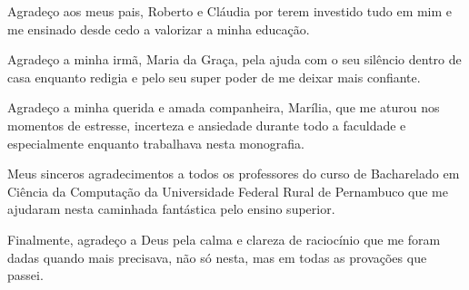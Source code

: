 Agradeço aos meus pais, Roberto e Cláudia por terem investido tudo em mim e me 
ensinado desde cedo a valorizar a minha educação.

Agradeço a minha irmã, Maria da Graça, pela ajuda com o seu silêncio dentro de 
casa enquanto redigia e pelo seu super poder de me deixar mais confiante.

Agradeço a minha querida e amada companheira, Marília, que me aturou nos 
momentos de estresse, incerteza e ansiedade durante todo a faculdade e 
especialmente enquanto trabalhava nesta monografia.

Meus sinceros agradecimentos a todos os professores do curso de Bacharelado em 
Ciência da Computação da Universidade Federal Rural de Pernambuco que me ajudaram 
nesta caminhada fantástica pelo ensino superior.

Finalmente, agradeço a Deus pela calma e clareza de raciocínio que me foram 
dadas quando mais precisava, não só nesta, mas em todas as provações que passei.